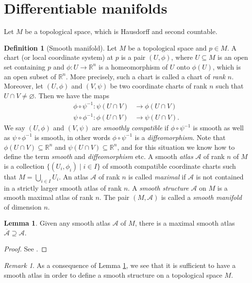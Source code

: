\documentclass[12pt]{amsart}
\numberwithin{equation}{section}
\theoremstyle{plain}
\theoremstyle{definition}
\newtheorem{defn}{Definition}[subsection]
\newtheorem{lem}{Lemma}[subsection]
\theoremstyle{remark}
\newtheorem{rem}{Remark}[subsection]
\newcommand{\R}{\mathbb{R}}
\newcommand{\calA}{\mathcal{A}}
\begin{document}
\section{Differentiable manifolds}
Let $M$ be a topological space, which is Hausdorff and second countable.
\begin{defn}[Smooth manifold]
Let $M$ be a topological space and $p\in M$. A chart (or local coordinate system) at $p$ is a pair $(U,\phi)$, where $U\subseteq M$ is an open set containing $p$ and $\phi\colon U\to \R^n$ is a homeomorphism of $U$ onto $\phi(U)$, which is an open subset of $\R^n$. More precisely, such a chart is called a chart of \emph{rank} $n$. Moreover, let $(U,\phi)$ and $(V,\psi)$ be two coordinate charts of rank $n$ such that $U\cap V\not=\varnothing$. Then we have the maps
\begin{align*}
\phi\circ\psi^{-1}\colon \psi(U\cap V)&\to \phi(U\cap V)\\
\psi\circ\phi^{-1}\colon \phi(U\cap V)&\to \psi(U\cap V).
\end{align*}
We say $(U,\phi)$ and $(V,\psi)$ are \emph{smoothly compatible} if $\phi\circ\psi^{-1}$ is smooth as well as $\psi\circ \phi^{-1}$ is smooth, in other words $\phi\circ\psi^{-1}$ is a \emph{diffeomorphism}. Note that $\phi(U\cap V)\subseteq \R^n$ and $\psi(U\cap V)\subseteq\R^n$, and for this situation we know how to define the term \emph{smooth} and \emph{diffeomorphism} etc. A smooth \emph{atlas} $\calA$ of rank $n$ of $M$ is a collection $\{(U_i,\phi_i)\mid i\in I\}$ of smooth compatible coordinate charts such that $M=\bigcup_{i\in I}U_i$. An atlas $\calA$ of rank $n$ is called \emph{maximal} if $\calA$ is not contained in a strictly larger smooth atlas of rank $n$. A \emph{smooth structure} $\calA$ on $M$ is a smooth maximal atlas of rank $n$. The pair $(M,\calA)$ is called a \emph{smooth manifold} of dimension $n$.
\end{defn}

\begin{lem}
\label{atlas}
Given any smooth atlas $\calA$ of $M$, there is a maximal smooth atlas $\overline{\calA}\supseteq \calA$.
\end{lem}

\begin{proof}
See \cite{Lee}.
\end{proof}

\begin{rem}
As a consequence of Lemma \ref{atlas}, we see that it is sufficient to have a smooth atlas in order to define a smooth structure on a topological space $M$.
\end{rem}
\end{document}
